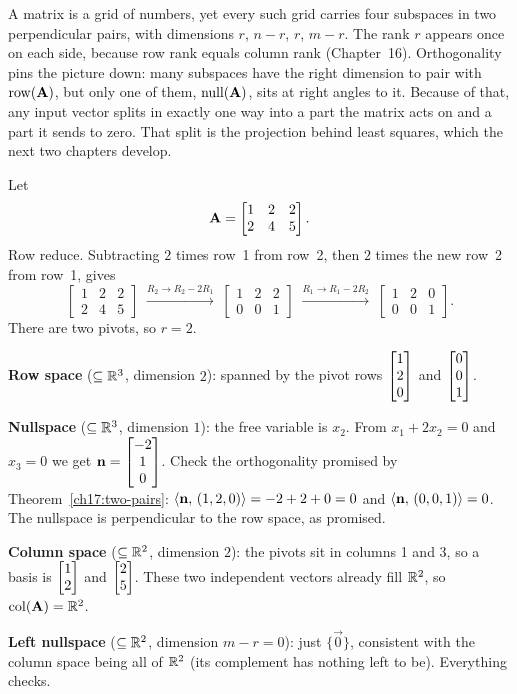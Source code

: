 \begin{aestheticbox}
A matrix is a grid of numbers, yet every such grid carries four subspaces in two
perpendicular pairs, with dimensions $r$, $n-r$, $r$, $m-r$. The rank $r$ appears once on each
side, because row rank equals column rank (Chapter~16). Orthogonality pins the picture down:
many subspaces have the right dimension to pair with $\operatorname{row}(\mathbf{A})$, but only one of them,
$\operatorname{null}(\mathbf{A})$, sits at right angles to it. Because of that, any input vector splits in
exactly one way into a part the matrix acts on and a part it sends to zero. That split is the
projection behind least squares, which the next two chapters develop.
\end{aestheticbox}

\begin{example}\label{ch17:four-spaces-worked}
Let
\[
  \mathbf{A}=\begin{bmatrix} 1 & 2 & 2\\ 2 & 4 & 5 \end{bmatrix}.
\]
Row reduce. Subtracting $2$ times row~1 from row~2, then $2$ times the new row~2 from row~1, gives
\[
  \begin{bmatrix}1&2&2\\2&4&5\end{bmatrix}
  \;\xrightarrow{R_2\to R_2-2R_1}\;
  \begin{bmatrix}1&2&2\\0&0&1\end{bmatrix}
  \;\xrightarrow{R_1\to R_1-2R_2}\;
  \begin{bmatrix}1&2&0\\0&0&1\end{bmatrix}.
\]
There are two pivots, so $r=2$.

\textbf{Row space} ($\subseteq\mathbb{R}^3$, dimension $2$): spanned by the pivot rows
$\begin{bmatrix}1\\2\\0\end{bmatrix}$ and $\begin{bmatrix}0\\0\\1\end{bmatrix}$.

\textbf{Nullspace} ($\subseteq\mathbb{R}^3$, dimension $1$): the free variable is $x_2$. From
$x_1+2x_2=0$ and $x_3=0$ we get $\mathbf{n}=\begin{bmatrix}-2\\1\\0\end{bmatrix}$. Check the orthogonality promised by
Theorem~\ref{ch17:two-pairs}: $\langle \mathbf{n},\, (1,2,0) \rangle=-2+2+0=0$ and $\langle \mathbf{n},\, (0,0,1) \rangle=0$.
The nullspace is perpendicular to the row space, as promised.

\textbf{Column space} ($\subseteq\mathbb{R}^2$, dimension $2$): the pivots sit in columns 1 and 3, so a
basis is $\begin{bmatrix}1\\2\end{bmatrix}$ and $\begin{bmatrix}2\\5\end{bmatrix}$. These two independent vectors already fill $\mathbb{R}^2$, so
$\operatorname{col}(\mathbf{A})=\mathbb{R}^2$.

\textbf{Left nullspace} ($\subseteq\mathbb{R}^2$, dimension $m-r=0$): just $\{\vec 0\}$, consistent with
the column space being all of $\mathbb{R}^2$ (its complement has nothing left to be). Everything checks.
\end{example}

